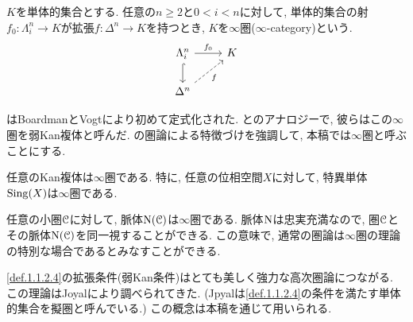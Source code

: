 \documentclass[uplatex, a4paper, 14Q, dvipdfmx]{jsreport}
\begin{document}
\begin{definition}[$\infty$圏] \label{def.1.1.2.4}
  $K$を単体的集合とする. 
  任意の$n \geq 2$と$0<i<n$に対して, 単体的集合の射$f_0 : \Lambda^n_i \to K$が拡張$f : \Delta^n \to K$を持つとき, $K$を$\infty$圏($\infty$-category)という.
  \[\begin{tikzcd}
    {\Lambda^n_i} & K \\
    {\Delta^n}
    \arrow["{f_0}", from=1-1, to=1-2]
    \arrow[hook, from=1-1, to=2-1]
    \arrow["f"', dashed, from=2-1, to=1-2]
  \end{tikzcd}\]
\end{definition}

はBoardmanとVogtにより初めて定式化された.
とのアナロジーで, 彼らはこの$\infty$圏を弱Kan複体と呼んだ. 
の圏論による特徴づけを強調して, 本稿では$\infty$圏と呼ぶことにする.

\begin{example} \label{eg.1.2.2.5}
  任意のKan複体は$\infty$圏である. 
  特に, 任意の位相空間$X$に対して, 特異単体$\mathrm{Sing}(X)$は$\infty$圏である. 
\end{example}

\begin{example} \label{eg.1.1.2.6}
  任意の小圏$\mathcal{C}$に対して, 脈体$\mathrm{N}(\mathcal{C})$は$\infty$圏である. 
  脈体$\mathrm{N}$は忠実充満なので, 圏$\mathcal{C}$とその脈体$\mathrm{N}(\mathcal{C})$を同一視することができる. 
  この意味で, 通常の圏論は$\infty$圏の理論の特別な場合であるとみなすことができる. 
\end{example}

\cref{def.1.1.2.4}の拡張条件(弱Kan条件)はとても美しく強力な高次圏論につながる.
この理論はJoyalにより調べられてきた. (Jpyalは\cref{def.1.1.2.4}の条件を満たす単体的集合を擬圏と呼んでいる.)
この概念は本稿を通じて用いられる. 
\end{document}
